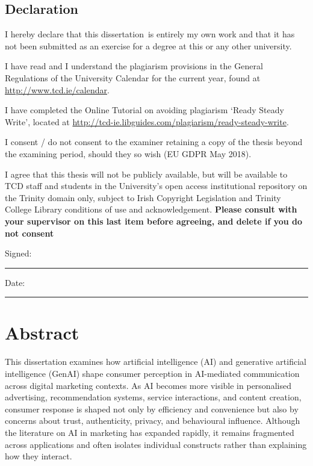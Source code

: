 \documentclass[a4paper,oneside,12pt]{book}
\title{\thesistitle}
\author{\authorname}
\newcommand{\typeofthesis}{dissertation} %
\numberwithin{equation}{chapter} %
\begin{document}

\section*{\Huge\textcolor{tcd_blue}{Declaration}}
\vspace{1cm}
I hereby declare that this \typeofthesis\ is entirely my own work and that it has not been submitted as an exercise for a degree at this or any other university.

\vspace{1cm}
I have read and I understand the plagiarism provisions in the General Regulations of the University Calendar for the current year, found at \url{http://www.tcd.ie/calendar}.
\vspace{1cm}

I have completed the Online Tutorial on avoiding plagiarism `Ready Steady Write', located at \url{http://tcd-ie.libguides.com/plagiarism/ready-steady-write}.
\vspace{1cm}

I consent / do not consent to the examiner retaining a copy of the thesis beyond the examining period, should they so wish (EU GDPR May 2018).
\vspace{1cm}

I agree that this thesis will not be publicly available, but will be available to TCD staff and students in the University’s open access institutional repository on the Trinity domain only, subject to Irish Copyright Legislation and Trinity College Library conditions of use and acknowledgement.  \textbf{Please consult with your supervisor on this last item before agreeing, and delete if you do not consent}
\vspace{3cm}

Signed:~\rule{5cm}{0.3pt}\hfill Date:~\rule{5cm}{0.3pt}

\chapter*{Abstract}
This dissertation examines how artificial intelligence (AI) and generative artificial intelligence (GenAI) shape consumer perception in AI-mediated communication across digital marketing contexts. As AI becomes more visible in personalised advertising, recommendation systems, service interactions, and content creation, consumer response is shaped not only by efficiency and convenience but also by concerns about trust, authenticity, privacy, and behavioural influence. Although the literature on AI in marketing has expanded rapidly, it remains fragmented across applications and often isolates individual constructs rather than explaining how they interact.
\end{document}
